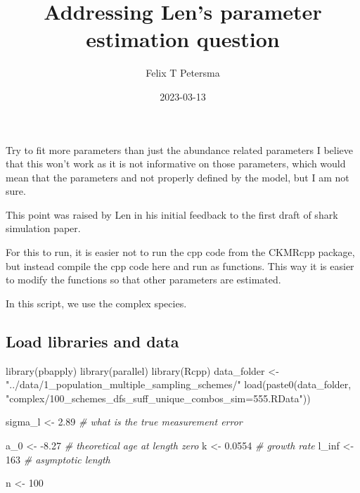 \documentclass[
]{article}
\title{Addressing Len's parameter estimation question}
\author{Felix T Petersma}
\date{2023-03-13}
\newenvironment{Shaded}{\begin{snugshade}}{\end{snugshade}}
\newcommand{\CommentTok}[1]{\textcolor[rgb]{0.56,0.35,0.01}{\textit{#1}}}
\newcommand{\DecValTok}[1]{\textcolor[rgb]{0.00,0.00,0.81}{#1}}
\newcommand{\FloatTok}[1]{\textcolor[rgb]{0.00,0.00,0.81}{#1}}
\newcommand{\FunctionTok}[1]{\textcolor[rgb]{0.00,0.00,0.00}{#1}}
\newcommand{\NormalTok}[1]{#1}
\newcommand{\OtherTok}[1]{\textcolor[rgb]{0.56,0.35,0.01}{#1}}
\newcommand{\SpecialCharTok}[1]{\textcolor[rgb]{0.00,0.00,0.00}{#1}}
\newcommand{\StringTok}[1]{\textcolor[rgb]{0.31,0.60,0.02}{#1}}
\begin{document}
\maketitle

Try to fit more parameters than just the abundance related parameters I
believe that this won't work as it is not informative on those
parameters, which would mean that the parameters and not properly
defined by the model, but I am not sure.

This point was raised by Len in his initial feedback to the first draft
of shark simulation paper.

For this to run, it is easier not to run the cpp code from the CKMRcpp
package, but instead compile the cpp code here and run as functions.
This way it is easier to modify the functions so that other parameters
are estimated.

In this script, we use the complex species.

\hypertarget{load-libraries-and-data}{%
\subsection{Load libraries and data}\label{load-libraries-and-data}}

\begin{Shaded}
\begin{Highlighting}[]
\FunctionTok{library}\NormalTok{(pbapply)}
\FunctionTok{library}\NormalTok{(parallel)}
\FunctionTok{library}\NormalTok{(Rcpp)}
\NormalTok{data\_folder }\OtherTok{\textless{}{-}} \StringTok{"../data/1\_population\_multiple\_sampling\_schemes/"}
\FunctionTok{load}\NormalTok{(}\FunctionTok{paste0}\NormalTok{(data\_folder, }\StringTok{"complex/100\_schemes\_dfs\_suff\_unique\_combos\_sim=555.RData"}\NormalTok{))}

\NormalTok{sigma\_l }\OtherTok{\textless{}{-}} \FloatTok{2.89}             \CommentTok{\# what is the true measurement error}

\NormalTok{a\_0 }\OtherTok{\textless{}{-}} \SpecialCharTok{{-}}\FloatTok{8.27}                \CommentTok{\# theoretical age at length zero              }
\NormalTok{k }\OtherTok{\textless{}{-}} \FloatTok{0.0554}                 \CommentTok{\# growth rate}
\NormalTok{l\_inf }\OtherTok{\textless{}{-}} \DecValTok{163}                \CommentTok{\# asymptotic length}

\NormalTok{n }\OtherTok{\textless{}{-}} \DecValTok{100}
\end{Highlighting}
\end{Shaded}
\end{document}
